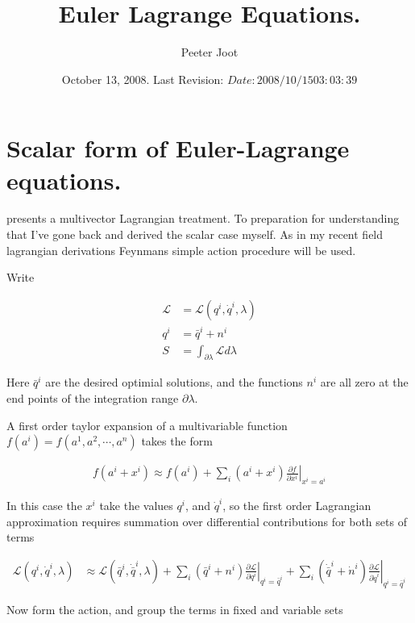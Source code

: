 \documentclass{article}
\title{Euler Lagrange Equations.}
\author{Peeter Joot}
\date{ October 13, 2008.  Last Revision: $Date: 2008/10/15 03:03:39 $ }
\newcommand{\LL}[0]{\mathcal{L}}
\newcommand{\qdot}[0]{\dot{q}}
\newcommand{\ndot}[0]{\dot{n}}
\newcommand{\qbar}[0]{\bar{q}}
\newcommand{\qdotbar}[0]{\dot{\bar{q}}}
\newcommand{\PD}[2]{\frac{\partial {#2}}{\partial {#1}}}
\begin{document}
\maketitle{}

\tableofcontents

\section{Scalar form of Euler-Lagrange equations.}

\cite{lasenby1993mda} presents a multivector Lagrangian treatment.  To
preparation for understanding that I've gone 
back and derived the scalar
case myself.  As in my recent field lagrangian derivations Feynmans
\cite{feynman1963flp} simple action procedure will be used.

Write 

\begin{align*}
\LL &= \LL(q^i, \qdot^i, \lambda) \\
q^i &= \qbar^i + n^i \\
S &= \int_{\partial \lambda} \LL d\lambda
\end{align*}

Here $\qbar^i$ are the desired optimial solutions, and the functions $n^i$
are all zero at the end points of the integration range $\partial \lambda$.

A first order taylor expansion of a multivariable function
$f(a^i) = f(a^1, a^2, \cdots, a^n)$
takes the form

\begin{align*}
f(a^i + x^i) \approx f(a^i) + \sum_i (a^i + x^i) \left. \PD{x^i}{f} \right\vert_{x^i = a^i}
\end{align*}

In this case the $x^i$ take the values $q^i$, and $\qdot^i$, so the first
order Lagrangian approximation requires summation over differential contributions for both sets of terms

\begin{align}\label{eqn:linearizedLagrangian}
\LL(q^i, \qdot^i, \lambda) 
&\approx \LL(\qbar^i, \qdotbar^i, \lambda) 
+ \sum_i (\qbar^i + n^i) \left. \PD{q^i}{\LL} \right\vert_{q^i = \qbar^i}
+ \sum_i (\qdotbar^i + \ndot^i) \left. \PD{\qdot^i}{\LL} \right\vert_{q^i = \qbar^i}
\end{align}

%
Now form the action, and group the terms in fixed and variable sets
\end{document}
